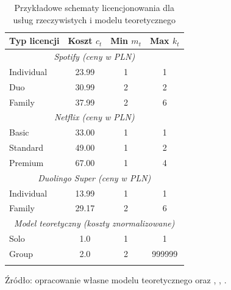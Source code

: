 \begin{table}[h!]
  \centering
  \caption{Przykładowe schematy licencjonowania dla usług rzeczywistych i modelu teoretycznego}
  \begin{tabular}{lccc}
    \hline
    \textbf{Typ licencji} & \textbf{Koszt $c_t$} & \textbf{Min $m_t$} & \textbf{Max $k_t$} \\
    \hline
    \multicolumn{4}{c}{\textit{Spotify (ceny w PLN)}}                                      \\
    Individual            & 23.99                & 1                  & 1                  \\
    Duo                   & 30.99                & 2                  & 2                  \\
    Family                & 37.99                & 2                  & 6                  \\
    \hline
    \multicolumn{4}{c}{\textit{Netflix (ceny w PLN)}}                                      \\
    Basic                 & 33.00                & 1                  & 1                  \\
    Standard              & 49.00                & 1                  & 2                  \\
    Premium               & 67.00                & 1                  & 4                  \\
    \hline
    \multicolumn{4}{c}{\textit{Duolingo Super (ceny w PLN)}}                               \\
    Individual            & 13.99                & 1                  & 1                  \\
    Family                & 29.17                & 2                  & 6                  \\
    \hline
    \multicolumn{4}{c}{\textit{Model teoretyczny (koszty znormalizowane)}}                 \\
    Solo                  & 1.0                  & 1                  & 1                  \\
    Group                 & 2.0                  & 2                  & 999999             \\
    \hline
    \label{tab:license_models_real}
  \end{tabular}

  Źródło: opracowanie własne modelu teoretycznego oraz \cite{spotify_price2024}, \cite{spotify_price2025}, \cite{duolingo_app2024}.

\end{table}


